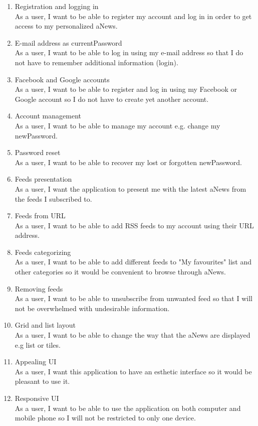 \documentclass[]{article}
\begin{document}
\begin{enumerate}
	\item Registration and logging in\\
	As a user, I want to be able to register my account and log in in order to get access to my personalized aNews.
	
	\item E-mail address as currentPassword\\
	As a user, I want to be able to log in using my e-mail address so that I do not have to remember additional information (login).
	
	\item Facebook and Google accounts\\
	As a user, I want to be able to register and log in using my Facebook or Google account so I do not have to create yet another account.
	
	\item Account management\\
	As a user, I want to be able to manage my account e.g. change my newPassword.
	
	\item Password reset\\
	As a user, I want to be able to recover my lost or forgotten newPassword.
	
	\item Feeds presentation\\
	As a user, I want the application to present me with the latest aNews from the feeds I subscribed to.
	
	\item Feeds from URL\\
	As a user, I want to be able to add RSS feeds to my account using their URL address.
	
	\item Feeds categorizing\\
	As a user, I want to be able to add different feeds to "My favourites" list and other categories so it would be convenient to browse through aNews.
	
	\item Removing feeds\\
	As a user, I want to be able to unsubscribe from unwanted feed so that I will not be overwhelmed with undesirable information. 
	
	\item Grid and list layout\\
	As a user, I want to be able to change the way that the aNews are displayed e.g list or tiles.
	
	\item Appealing UI\\
	As a user, I want this application to have an esthetic interface so it would be pleasant to use it.
	
	\item Responsive UI\\
	As a user, I want to be able to use the application on both computer and mobile phone so I will not be restricted to only one device.
\end{enumerate}
\end{document}
